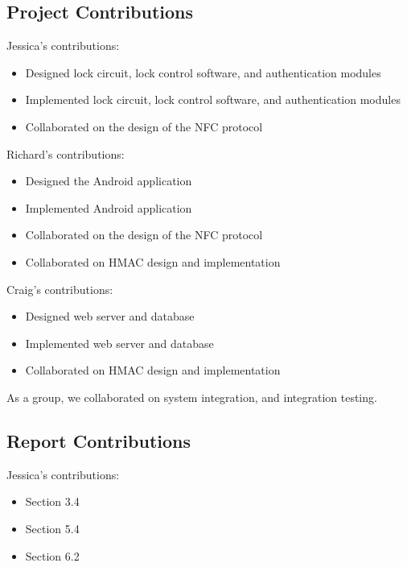\documentclass[12pt]{report}
\let\Oldsubsection\subsection
\renewcommand{\subsection}{\FloatBarrier\Oldsubsection}
\begin{document}

\subsection{Project Contributions} \label{project-contributions}

Jessica's contributions:
\begin{itemize}
\item Designed lock circuit, lock control software, and authentication modules
\item Implemented lock circuit, lock control software, and authentication modules
\item Collaborated on the design of the NFC protocol
\end{itemize}

Richard's contributions:
\begin{itemize}
\item Designed the Android application
\item Implemented Android application
\item Collaborated on the design of the NFC protocol
\item Collaborated on HMAC design and implementation
\end{itemize}

Craig's contributions:
\begin{itemize}
\item Designed web server and database
\item Implemented web server and database
\item Collaborated on HMAC design and implementation
\end{itemize}

As a group, we collaborated on system integration, and integration testing.


\subsection{Report Contributions} \label{report-contributions}

Jessica's contributions:
\begin{itemize}
\item Section 3.4
\item Section 5.4
\item Section 6.2
\end{itemize}
\end{document}
